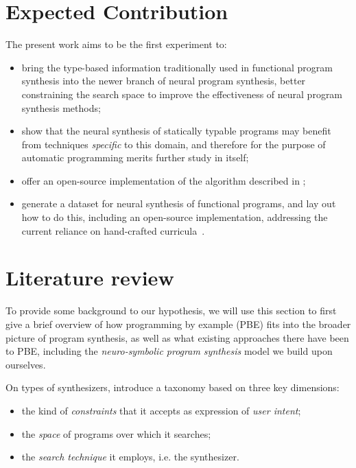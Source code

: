 \documentclass{article}
\begin{document}

\section{Expected Contribution} %

The present work aims to be the first experiment to:
\begin{itemize}
    \item bring the type-based information traditionally used in functional program synthesis into the newer branch of neural program synthesis,
    better constraining the search space to improve the effectiveness of neural program synthesis methods;
    \item show that the neural synthesis of statically typable programs may benefit from techniques \emph{specific} to this domain, and therefore for the purpose of automatic programming merits further study in itself;
    \item offer an open-source implementation of the algorithm described in \citet{nsps};
    \item generate a dataset for neural synthesis of functional programs, and lay out how to do this, including an open-source implementation, addressing the current reliance on hand-crafted curricula~\citep{nps}.
\end{itemize}


\section{Literature review} \label{sec:litreview}

To provide some background to our hypothesis,
we will use this section to first give a brief overview of how programming by example (PBE) fits into the broader picture of program synthesis,
as well as what existing approaches there have been to PBE,
including the \emph{neuro-symbolic program synthesis} model we build upon ourselves.

On types of synthesizers,
\citet{gulwani2017program} introduce a taxonomy based on three key dimensions:
\begin{itemize}
    \item the kind of \emph{constraints} that it accepts as expression of \emph{user intent};
    \item the \emph{space} of programs over which it searches;
    \item the \emph{search technique} it employs, i.e. the synthesizer.
\end{itemize}
\end{document}

